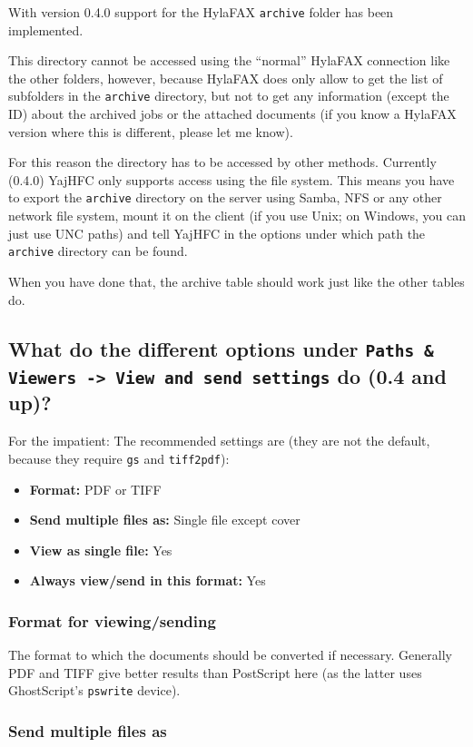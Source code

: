 \documentclass[a4paper,10pt]{scrartcl}
\begin{document}
With version 0.4.0 support for the HylaFAX \texttt{archive} folder has been implemented.

This directory cannot be accessed using the ``normal'' HylaFAX connection like the other folders, however, because HylaFAX does only allow to get the list of subfolders in the \texttt{archive} directory, but not to get any information (except the ID) about the archived jobs or the attached documents (if you know a HylaFAX version where this is different, please let me know).

For this reason the directory has to be accessed by other methods. Currently (0.4.0) YajHFC only supports access using the file system. This means you have to export the  \texttt{archive} directory on the server using Samba, NFS or any other network file system, mount it on the client (if you use Unix; on Windows, you can just use UNC paths) and tell YajHFC in the options under which path the \texttt{archive} directory can be found.

When you have done that, the archive table should work just like the other tables do.

\subsection{What do the different options under \texttt{Paths \& Viewers -> View and send settings} do (0.4 and up)?}

For the impatient: The recommended settings are (they are not the default, because they require \texttt{gs} and \texttt{tiff2pdf}):
\begin{itemize}
 \item \textbf{Format:} PDF or TIFF
 \item \textbf{Send multiple files as:} Single file except cover
 \item \textbf{View as single file:} Yes
 \item \textbf{Always view/send in this format:} Yes
\end{itemize}

\subsubsection{Format for viewing/sending}

The format to which the documents should be converted if necessary. Generally PDF and TIFF give better results than PostScript here (as the latter uses GhostScript's \texttt{pswrite} device).

\subsubsection{Send multiple files as}
\end{document}

